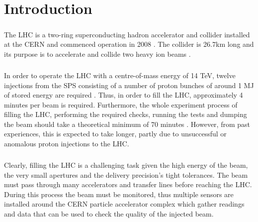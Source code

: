 \chapter{Introduction}

\paragraph{ }The \ac{LHC} is a two-ring superconducting hadron accelerator and collider installed at the \ac{CERN} and commenced operation in 2008 \cite{Evans2008}. The collider is 26.7km long and its purpose is to accelerate and collide two heavy ion beams \cite{Valentino2017}.

\paragraph{ }In order to operate the \acs{LHC} with a centre-of-mass energy of 14 \ac{TeV}, twelve injections from the \ac{SPS} consisting of a number of proton bunches of around 1 \ac{MJ} of stored energy are required \cite{Drosdal2011}. Thus, in order to fill the \acs{LHC}, approximately 4 minutes per beam is required. Furthermore, the whole experiment process of filling the LHC, performing the required checks, running the tests and dumping the beam should take a theoretical minimum of 70 minutes \cite{Evans2008}. However, from past experiences, this is expected to take longer, partly due to unsuccessful or anomalous proton injections to the \acs{LHC}. 

\paragraph{ }Clearly, filling the \acs{LHC} is a challenging task given the high energy of the beam, the very small apertures and the delivery precision's tight tolerances. The beam must pass through many accelerators and transfer lines before reaching the \acs{LHC}. During this process the beam must be monitored, thus multiple sensors are installed around the \acs{CERN} particle accelerator complex \cite{Lefevre2008} which gather readings and data that can be used to check the quality of the injected beam. 


